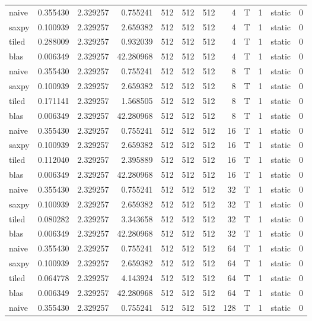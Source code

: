 \documentclass[
  12pt,
  xcolor = usenames,dvipsnames]{article}
\begin{document}
\begin{table}[!h]
{\begin{tabular}[t]{lrrrrrrrlrlr}
\addlinespace
naive & 0.355430 & 2.329257 & 0.755241 & 512 & 512 & 512 & 4 & T & 1 & static & 0\\
saxpy & 0.100939 & 2.329257 & 2.659382 & 512 & 512 & 512 & 4 & T & 1 & static & 0\\
tiled & 0.288009 & 2.329257 & 0.932039 & 512 & 512 & 512 & 4 & T & 1 & static & 0\\
blas & 0.006349 & 2.329257 & 42.280968 & 512 & 512 & 512 & 4 & T & 1 & static & 0\\
naive & 0.355430 & 2.329257 & 0.755241 & 512 & 512 & 512 & 8 & T & 1 & static & 0\\
\addlinespace
saxpy & 0.100939 & 2.329257 & 2.659382 & 512 & 512 & 512 & 8 & T & 1 & static & 0\\
tiled & 0.171141 & 2.329257 & 1.568505 & 512 & 512 & 512 & 8 & T & 1 & static & 0\\
blas & 0.006349 & 2.329257 & 42.280968 & 512 & 512 & 512 & 8 & T & 1 & static & 0\\
naive & 0.355430 & 2.329257 & 0.755241 & 512 & 512 & 512 & 16 & T & 1 & static & 0\\
saxpy & 0.100939 & 2.329257 & 2.659382 & 512 & 512 & 512 & 16 & T & 1 & static & 0\\
\addlinespace
tiled & 0.112040 & 2.329257 & 2.395889 & 512 & 512 & 512 & 16 & T & 1 & static & 0\\
blas & 0.006349 & 2.329257 & 42.280968 & 512 & 512 & 512 & 16 & T & 1 & static & 0\\
naive & 0.355430 & 2.329257 & 0.755241 & 512 & 512 & 512 & 32 & T & 1 & static & 0\\
saxpy & 0.100939 & 2.329257 & 2.659382 & 512 & 512 & 512 & 32 & T & 1 & static & 0\\
tiled & 0.080282 & 2.329257 & 3.343658 & 512 & 512 & 512 & 32 & T & 1 & static & 0\\
\addlinespace
blas & 0.006349 & 2.329257 & 42.280968 & 512 & 512 & 512 & 32 & T & 1 & static & 0\\
naive & 0.355430 & 2.329257 & 0.755241 & 512 & 512 & 512 & 64 & T & 1 & static & 0\\
saxpy & 0.100939 & 2.329257 & 2.659382 & 512 & 512 & 512 & 64 & T & 1 & static & 0\\
tiled & 0.064778 & 2.329257 & 4.143924 & 512 & 512 & 512 & 64 & T & 1 & static & 0\\
blas & 0.006349 & 2.329257 & 42.280968 & 512 & 512 & 512 & 64 & T & 1 & static & 0\\
\addlinespace
naive & 0.355430 & 2.329257 & 0.755241 & 512 & 512 & 512 & 128 & T & 1 & static & 0\\

\end{tabular}}
\end{table}
\end{document}
